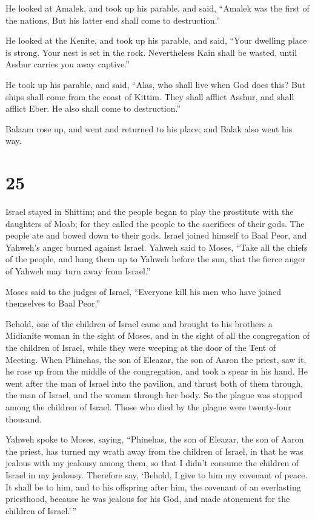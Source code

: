  He looked at Amalek, and took up his parable, and said,
``Amalek was the first of the nations, But his latter end shall come to
destruction.''

 He looked at the Kenite, and took up his parable, and
said, ``Your dwelling place is strong. Your nest is set in the rock.
 Nevertheless Kain shall be wasted, until Asshur carries
you away captive.''

 He took up his parable, and said, ``Alas, who shall live
when God does this?  But ships shall come from the coast
of Kittim. They shall afflict Asshur, and shall afflict Eber. He also
shall come to destruction.''

 Balaam rose up, and went and returned to his place; and
Balak also went his way.

\hypertarget{section-24}{%
\section{25}\label{section-24}}

 Israel stayed in Shittim; and the people began to play
the prostitute with the daughters of Moab;  for they
called the people to the sacrifices of their gods. The people ate and
bowed down to their gods.  Israel joined himself to Baal
Peor, and Yahweh's anger burned against Israel.  Yahweh
said to Moses, ``Take all the chiefs of the people, and hang them up to
Yahweh before the sun, that the fierce anger of Yahweh may turn away
from Israel.''

 Moses said to the judges of Israel, ``Everyone kill his
men who have joined themselves to Baal Peor.''

 Behold, one of the children of Israel came and brought to
his brothers a Midianite woman in the sight of Moses, and in the sight
of all the congregation of the children of Israel, while they were
weeping at the door of the Tent of Meeting.  When
Phinehas, the son of Eleazar, the son of Aaron the priest, saw it, he
rose up from the middle of the congregation, and took a spear in his
hand.  He went after the man of Israel into the pavilion,
and thrust both of them through, the man of Israel, and the woman
through her body. So the plague was stopped among the children of
Israel.  Those who died by the plague were twenty-four
thousand.

 Yahweh spoke to Moses, saying, 
``Phinehas, the son of Eleazar, the son of Aaron the priest, has turned
my wrath away from the children of Israel, in that he was jealous with
my jealousy among them, so that I didn't consume the children of Israel
in my jealousy.  Therefore say, `Behold, I give to him my
covenant of peace.  It shall be to him, and to his
offspring after him, the covenant of an everlasting priesthood, because
he was jealous for his God, and made atonement for the children of
Israel.'\,''

